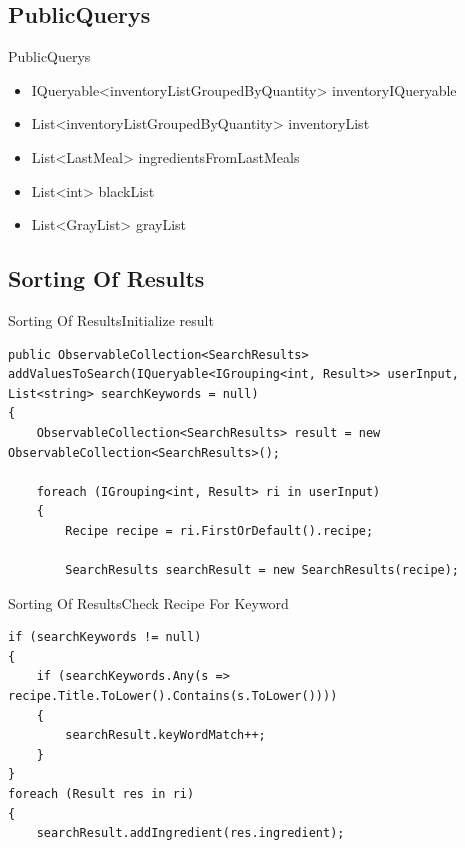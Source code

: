 \subsection{PublicQuerys}
\begin{frame}{PublicQuerys}
    \begin{itemize}
        \item IQueryable<inventoryListGroupedByQuantity> inventoryIQueryable
        \item List<inventoryListGroupedByQuantity> inventoryList
        \item List<LastMeal> ingredientsFromLastMeals
        \item List<int> blackList
        \item List<GrayList> grayList
    \end{itemize}
\end{frame}


\subsection{Sorting Of Results}
\begin{frame}[fragile]{Sorting Of Results}{Initialize result}
\begin{lstlisting}
public ObservableCollection<SearchResults> addValuesToSearch(IQueryable<IGrouping<int, Result>> userInput, List<string> searchKeywords = null)
{
    ObservableCollection<SearchResults> result = new ObservableCollection<SearchResults>();

    foreach (IGrouping<int, Result> ri in userInput)
    {
        Recipe recipe = ri.FirstOrDefault().recipe;

        SearchResults searchResult = new SearchResults(recipe);
\end{lstlisting}
\end{frame}

\begin{frame}[fragile]{Sorting Of Results}{Check Recipe For Keyword}
\begin{lstlisting}
if (searchKeywords != null)
{
    if (searchKeywords.Any(s => recipe.Title.ToLower().Contains(s.ToLower())))
    {
        searchResult.keyWordMatch++;
    }
}
foreach (Result res in ri)
{
    searchResult.addIngredient(res.ingredient);
\end{lstlisting}
\end{frame}

